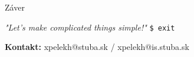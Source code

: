 \documentclass[10pt]{beamer}
\begin{document}
\begin{frame}[fragile]{Záver}
    \begin{center}
        \begin{exampleblock}{\textit{"Let's make complicated things simple!"}}
            \texttt{\$ exit}
            \vspace{0.2cm}
        \end{exampleblock}
        \vspace{0.8cm}
        \textbf{Kontakt:} xpelekh@stuba.sk / xpelekh@is.stuba.sk
    \end{center}
\end{frame}
\end{document}
